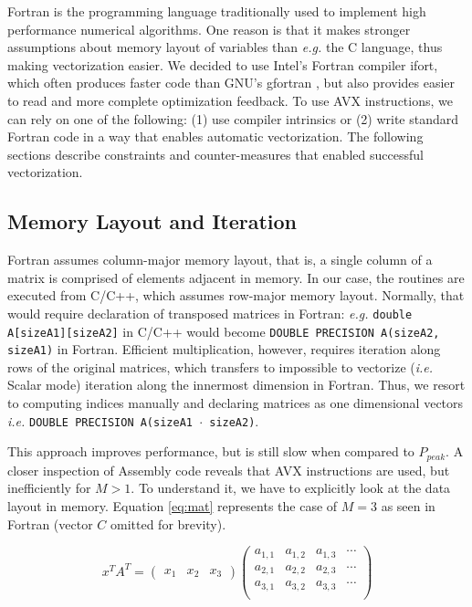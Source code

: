 \documentclass[journal, a4paper]{IEEEtran}
\begin{document}
  Fortran is the programming language traditionally used to implement high performance numerical algorithms. One reason is that it makes stronger assumptions about memory layout of variables than \textit{e.g.} the C language, thus making vectorization easier.  We decided to use Intel's Fortran compiler ifort, which often produces faster code than GNU's gfortran \cite{intel_comp}, but also provides easier to read and more complete optimization feedback. To use AVX instructions, we can rely on one of the following: (1) use compiler intrinsics or (2) write standard Fortran code in a way that enables automatic vectorization. The following sections describe constraints and counter-measures that enabled successful vectorization.
  
  \subsection{Memory Layout and Iteration}
    Fortran assumes column-major memory layout, that is, a single column of a matrix is comprised of elements adjacent in memory. In our case, the routines are executed from C/C++, which assumes row-major memory layout. Normally, that would require declaration of transposed matrices in Fortran: \textit{e.g.} \texttt{double A[sizeA1][sizeA2]} in C/C++ would become \texttt{DOUBLE PRECISION A(sizeA2, sizeA1)} in Fortran. Efficient multiplication, however, requires iteration along rows of the original matrices, which transfers to impossible to vectorize (\textit{i.e.} Scalar mode) iteration along the innermost dimension in Fortran. Thus, we resort to computing indices manually and declaring matrices as one dimensional vectors \textit{i.e.} \texttt{DOUBLE~PRECISION~A(sizeA1~$\cdot$~sizeA2)}. 
    
    This approach improves performance, but is still slow when compared to $P_{peak}$. A closer inspection of Assembly code reveals that AVX instructions are used, but inefficiently for $M > 1$. To understand it, we have to explicitly look at the data layout in memory. Equation \ref{eq:mat} represents the case of $M = 3$ as seen in Fortran (vector $C$ omitted for brevity).
    
  \begin{equation}
    x^TA^T = \begin{pmatrix}
	  x_1 & x_2 & x_3
	  \end{pmatrix}
	  \begin{pmatrix}
	    a_{1, 1} & a_{1, 2} & a_{1, 3} & \cdots \\
	    a_{2, 1} & a_{2, 2} & a_{2, 3} & \cdots \\
	    a_{3, 1} & a_{3, 2} & a_{3, 3} & \cdots \\
	  \end{pmatrix}
	  \label{eq:mat}
  \end{equation}
\end{document}
